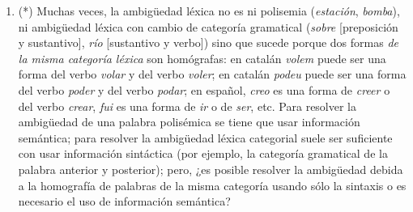 \begin{enumerate}
\item (*) Muchas veces, la ambigüedad léxica no es ni polisemia (\emph{estación}, \emph{bomba}), ni ambigüedad léxica con cambio de categoría gramatical (\emph{sobre} [preposición y sustantivo], \emph{río} [sustantivo y verbo]) sino que sucede porque dos formas \emph{de la misma categoría léxica} son homógrafas: en catalán \emph{volem} puede ser una forma del verbo \emph{volar} y del verbo \emph{voler}; en catalán \emph{podeu} puede ser una forma del verbo \emph{poder} y del verbo \emph{podar}; en español, \emph{creo} es una forma de \emph{creer} o del verbo \emph{crear}, \emph{fui} es una forma de \emph{ir} o de \emph{ser}, etc. Para resolver la ambigüedad de una palabra polisémica se tiene que usar información semántica; para resolver la ambigüedad léxica categorial suele ser suficiente con usar información sintáctica (por ejemplo, la categoría gramatical de la palabra anterior y posterior); pero, ¿es posible resolver la ambigüedad debida a la homografía de palabras de la misma categoría usando sólo la sintaxis o es necesario el uso de información semántica? 


\end{enumerate}
